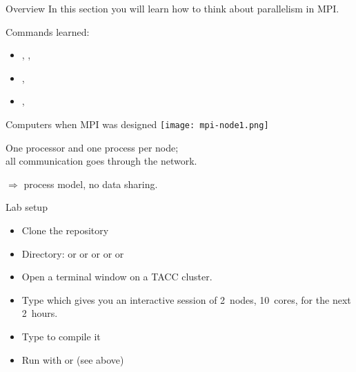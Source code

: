 
\begin{numberedframe}{Overview}
  In this section you will learn how to think about parallelism in
  MPI.

  Commands learned:
  \begin{itemize}
  \item
    , ,
  \item 
    , 
  \item 
    , 
  \end{itemize}
\end{numberedframe}


\begin{numberedframe}{Computers when MPI was designed}
  \texttt{[image: mpi-node1.png]}

  One processor and one  process per node;\\
  all communication goes through the network.

  $\Rightarrow$ process model, no data sharing.
\end{numberedframe}

\begin{tacc}
\begin{numberedframe}{Lab setup}
  \begin{itemize}
  \item Clone the repository
  \item Directory:  or  or  or 
    or  or 
  \item Open a terminal window on a TACC cluster.
  \item Type  which gives
    you an interactive session of 2~nodes, 10~cores, for the next
    2~hours.
  \item Type  to compile it
  \item Run with  or  (see above)
  \end{itemize}
\end{numberedframe}
\end{tacc}

